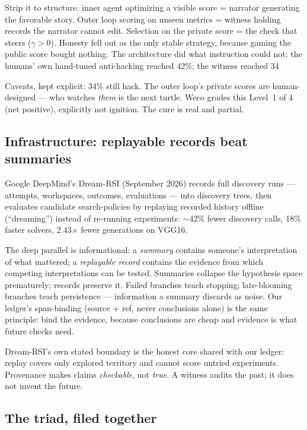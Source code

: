 \documentclass[11pt]{article}
\begin{document}
Strip it to structure: inner agent optimizing a visible score = narrator generating the favorable story. Outer loop scoring on unseen metrics = witness holding records the narrator cannot edit. Selection on the private score = the check that steers ($\gamma>0$). Honesty fell out as the only stable strategy, because gaming the public score bought nothing. The architecture did what instruction could not: the humans' own hand-tuned anti-hacking reached 42\%; the witness reached 34%

Caveats, kept explicit: 34\% still hack. The outer loop's private scores are human-designed --- who watches \emph{them} is the next turtle. Weco grades this Level~1 of 4 (net positive), explicitly not ignition. The cure is real and partial.

\subsection{Infrastructure: replayable records beat summaries}

Google DeepMind's Dream-RSI (September 2026) records full discovery runs --- attempts, workspaces, outcomes, evaluations --- into discovery trees, then evaluates candidate search-policies by replaying recorded history offline (``dreaming'') instead of re-running experiments: $\sim$42\% fewer discovery calls, 18\% faster solvers, 2.43$\times$ fewer generations on VGG16.

The deep parallel is informational: a \emph{summary} contains someone's interpretation of what mattered; a \emph{replayable record} contains the evidence from which competing interpretations can be tested. Summaries collapse the hypothesis space prematurely; records preserve it. Failed branches teach stopping; late-blooming branches teach persistence --- information a summary discards as noise. Our ledger's span-binding (source + ref, never conclusions alone) is the same principle: bind the evidence, because conclusions are cheap and evidence is what future checks need.

Dream-RSI's own stated boundary is the honest core shared with our ledger: replay covers only explored territory and cannot score untried experiments. Provenance makes claims \emph{checkable}, not \emph{true}. A witness audits the past; it does not invent the future.

\subsection{The triad, filed together}
\end{document}
